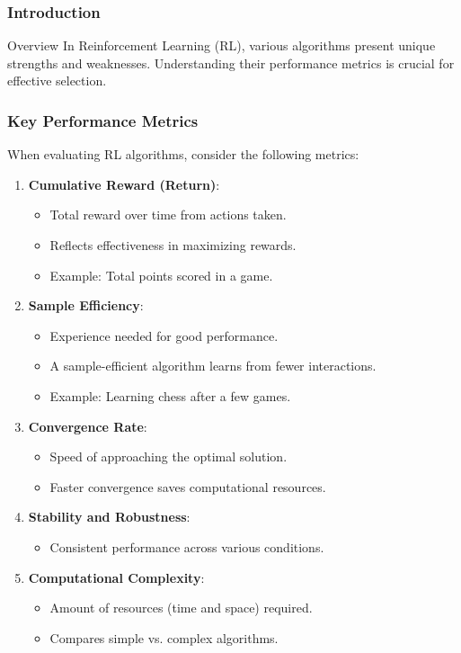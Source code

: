 \documentclass[aspectratio=169]{beamer}
\begin{document}
\begin{frame}[fragile]
    \frametitle{Introduction}
    \begin{block}{Overview}
        In Reinforcement Learning (RL), various algorithms present unique strengths and weaknesses. Understanding their performance metrics is crucial for effective selection.
    \end{block}
\end{frame}

\begin{frame}[fragile]
    \frametitle{Key Performance Metrics}
    When evaluating RL algorithms, consider the following metrics:
    \begin{enumerate}
        \item \textbf{Cumulative Reward (Return)}:
        \begin{itemize}
            \item Total reward over time from actions taken.
            \item Reflects effectiveness in maximizing rewards.
            \item Example: Total points scored in a game.
        \end{itemize}
        
        \item \textbf{Sample Efficiency}:
        \begin{itemize}
            \item Experience needed for good performance.
            \item A sample-efficient algorithm learns from fewer interactions.
            \item Example: Learning chess after a few games.
        \end{itemize}
        
        \item \textbf{Convergence Rate}:
        \begin{itemize}
            \item Speed of approaching the optimal solution.
            \item Faster convergence saves computational resources.
        \end{itemize}
        
        \item \textbf{Stability and Robustness}:
        \begin{itemize}
            \item Consistent performance across various conditions.
        \end{itemize}
        
        \item \textbf{Computational Complexity}:
        \begin{itemize}
            \item Amount of resources (time and space) required.
            \item Compares simple vs. complex algorithms.
        \end{itemize}
    \end{enumerate}
\end{frame}
\end{document}
